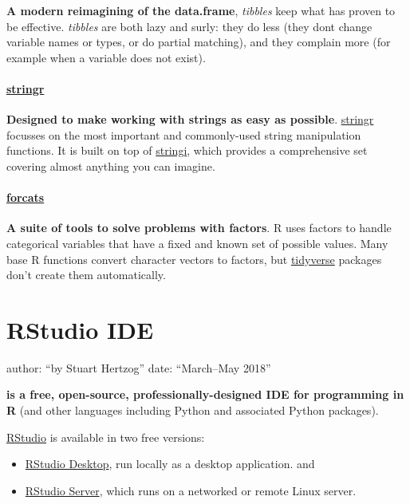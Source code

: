 \documentclass[]{book}
\providecommand{\tightlist}{%
  \setlength{\itemsep}{0pt}\setlength{\parskip}{0pt}}
\theoremstyle{definition}
\theoremstyle{definition}
\theoremstyle{definition}
\theoremstyle{remark}
\begin{document}
\textbf{A modern reimagining of the data.frame}, \emph{tibbles} keep
what has proven to be effective. \emph{tibbles} are both lazy and surly:
they do less (they dont change variable names or types, or do partial
matching), and they complain more (for example when a variable does not
exist).

\hypertarget{stringr}{%
\subsubsection{\texorpdfstring{\href{http://stringr.tidyverse.org/}{stringr}}{stringr}}\label{stringr}}

\textbf{Designed to make working with strings as easy as possible}.
\href{http://stringr.tidyverse.org/}{stringr} focusses on the most
important and commonly-used string manipulation functions. It is built
on top of \href{https://github.com/gagolews/stringi}{stringi}, which
provides a comprehensive set covering almost anything you can imagine.

\hypertarget{forcats}{%
\subsubsection{\texorpdfstring{\href{http://forcats.tidyverse.org/}{forcats}}{forcats}}\label{forcats}}

\textbf{A suite of tools to solve problems with factors}. R uses factors
to handle categorical variables that have a fixed and known set of
possible values. Many base R functions convert character vectors to
factors, but \href{http://tidyverse.org/}{tidyverse} packages don't
create them automatically.

\hypertarget{rstudio-ide}{%
\chapter{RStudio IDE}\label{rstudio-ide}}

author: ``by Stuart Hertzog'' date: ``March--May 2018''

\href{https://www.rstudio.com/products/rstudio}{}\textbf{is a free,
open-source, professionally-designed IDE for programming in R} (and
other languages including Python and associated Python packages).

\href{https://en.wikipedia.org/wiki/RStudio}{RStudio} is available in
two free versions:

\begin{itemize}
\tightlist
\item
  \href{https://www.rstudio.com/products/rstudio/\#Desktop}{RStudio
  Desktop}, run locally as a desktop application. and
\item
  \href{https://www.rstudio.com/products/rstudio/\#Server}{RStudio
  Server}, which runs on a networked or remote Linux server.
\end{itemize}
\end{document}
